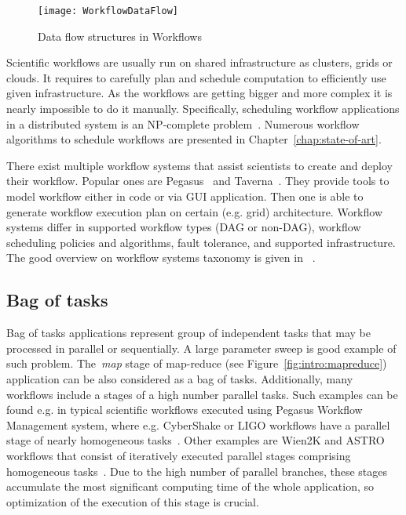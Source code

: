 \begin{figure}[tb]
   \centering
   \texttt{[image: WorkflowDataFlow]}  
   \caption{Data flow structures in Workflows~\cite{Bharathi08}}
   \label{fig:intro:workflow:structures}
\end{figure} 


Scientific workflows are usually run on shared infrastructure as clusters, grids or clouds. It requires to carefully plan and schedule computation to efficiently use given infrastructure. As the workflows are getting bigger and more complex it is nearly impossible to do it manually. Specifically, scheduling workflow applications in a distributed system is an NP-complete problem~\cite{Garey:1979:CIG:578533}. Numerous workflow algorithms to schedule workflows are presented in Chapter \ref{chap:state-of-art}.

There exist multiple workflow systems that assist scientists to create and deploy their workflow. Popular ones are Pegasus~\cite{Pegasus} and Taverna~\cite{Taverna}. They provide tools to model workflow either in code or via GUI application. Then one is able to generate workflow execution plan on certain (e.g. grid) architecture. Workflow systems differ in supported workflow types (DAG or non-DAG), workflow scheduling policies and algorithms, fault tolerance, and supported infrastructure. The good overview on workflow systems taxonomy is given in ~\cite{Yu:2005:TSW:1084805.1084814}.

\subsection{Bag of tasks}

Bag of tasks applications represent group of independent tasks that may be processed in parallel or sequentially. A large parameter sweep is good example of such problem. The \emph{map} stage of map-reduce (see Figure~\ref{fig:intro:mapreduce}) application can be also considered as a bag of tasks. Additionally, many workflows include a stages of a high number parallel tasks. Such examples can be found e.g. in typical scientific workflows executed using Pegasus Workflow Management system, where e.g. CyberShake or LIGO workflows have a parallel stage of nearly homogeneous tasks~\cite{Bharathi08}. Other examples are Wien2K and ASTRO workflows that consist of iteratively executed parallel stages comprising homogeneous tasks~\cite{Duan12}. Due to the high number of parallel branches, these stages accumulate the most significant computing time of the whole application, so optimization of the execution of this stage is crucial.


